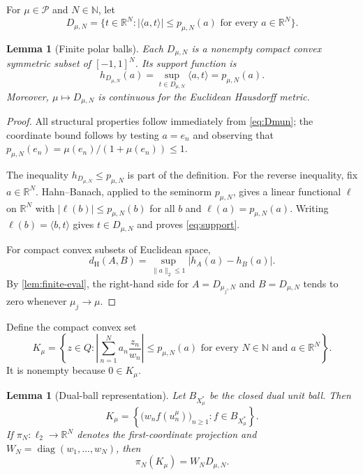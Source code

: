 \documentclass[11pt]{article}
\newtheorem{lemma}[theorem]{Lemma}
\theoremstyle{definition}
\newcommand{\Pcal}{\mathcal P}
\newcommand{\N}{\mathbb N}
\newcommand{\R}{\mathbb R}
\newcommand{\ellTwo}{\ell_2}
\newcommand{\Ball}{B}
\newcommand{\Haus}{d_{\mathrm H}}
\begin{document}
For $\mu\in\Pcal$ and $N\in\N$, let
\[
 D_{\mu,N}=
 \{t\in\R^N: |\langle a,t\rangle|\leq p_{\mu,N}(a)
                 \text{ for every }a\in\R^N\}.
 \tag{4.5}\label{eq:Dmun}
\]

\begin{lemma}[Finite polar balls]\label{lem:finite-polar}
Each $D_{\mu,N}$ is a nonempty compact convex symmetric subset of
$[-1,1]^N$.  Its support function is
\[
 h_{D_{\mu,N}}(a)=\sup_{t\in D_{\mu,N}}\langle a,t\rangle
 =p_{\mu,N}(a).
 \tag{4.6}\label{eq:support}
\]
Moreover, $\mu\mapsto D_{\mu,N}$ is continuous for the Euclidean Hausdorff
metric.
\end{lemma}

\begin{proof}
All structural properties follow immediately from \eqref{eq:Dmun}; the coordinate
bound follows by testing $a=e_n$ and observing that
$p_{\mu,N}(e_n)=\mu(e_n)/(1+\mu(e_n))\leq1$.

The inequality $h_{D_{\mu,N}}\leq p_{\mu,N}$ is part of the definition.  For the
reverse inequality, fix $a\in\R^N$.  Hahn--Banach, applied to the seminorm
$p_{\mu,N}$, gives a linear functional $\ell$ on $\R^N$ with
$|\ell(b)|\leq p_{\mu,N}(b)$ for all $b$ and $\ell(a)=p_{\mu,N}(a)$.  Writing
$\ell(b)=\langle b,t\rangle$ gives $t\in D_{\mu,N}$ and proves
\eqref{eq:support}.

For compact convex subsets of Euclidean space,
\[
 \Haus(A,B)=\sup_{\|a\|_2\leq1}|h_A(a)-h_B(a)|.
 \tag{4.7}\label{eq:haus-support}
\]
By \cref{lem:finite-eval}, the right-hand side for
$A=D_{\mu_j,N}$ and $B=D_{\mu,N}$ tends to zero whenever $\mu_j\to\mu$.
\end{proof}

Define the compact convex set
\[
 K_\mu=\left\{z\in Q:
 \left|\sum_{n=1}^N a_n\frac{z_n}{w_n}\right|
 \leq p_{\mu,N}(a)
 \text{ for every }N\in\N\text{ and }a\in\R^N\right\}.
 \tag{4.8}\label{eq:Kmu}
\]
It is nonempty because $0\in K_\mu$.

\begin{lemma}[Dual-ball representation]\label{lem:dual-rep}
Let $\Ball_{X_\mu^*}$ be the closed dual unit ball.  Then
\[
 K_\mu=
 \left\{\bigl(w_nf(u_n^\mu)\bigr)_{n\geq1}:
             f\in\Ball_{X_\mu^*}\right\}.
 \tag{4.9}\label{eq:dual-rep}
\]
If $\pi_N:\ellTwo\to\R^N$ denotes the first-coordinate projection and
$W_N=\operatorname{diag}(w_1,\ldots,w_N)$, then
\[
 \pi_N(K_\mu)=W_ND_{\mu,N}.
 \tag{4.10}\label{eq:finite-proj}
\]
\end{lemma}
\end{document}
